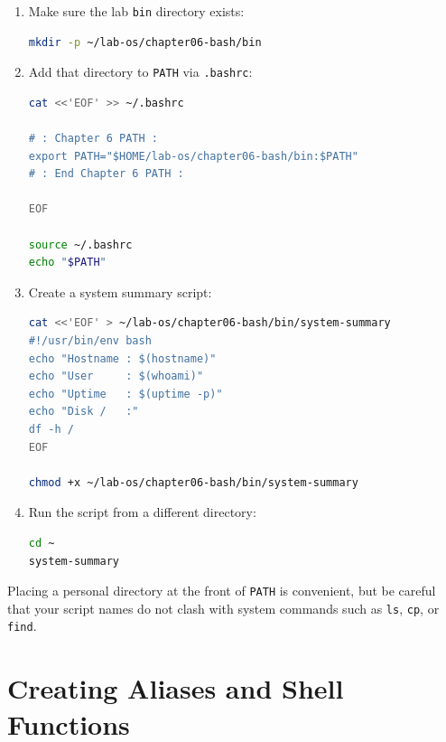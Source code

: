 \begin{enumerate}
  \item Make sure the lab \texttt{bin} directory exists:
\begin{lstlisting}[language=bash, caption={Preparing the bin directory}]
mkdir -p ~/lab-os/chapter06-bash/bin
\end{lstlisting}

  \item Add that directory to \texttt{PATH} via \texttt{.bashrc}:
\begin{lstlisting}[language=bash, caption={Adding the bin directory to PATH}]
cat <<'EOF' >> ~/.bashrc

# : Chapter 6 PATH :
export PATH="$HOME/lab-os/chapter06-bash/bin:$PATH"
# : End Chapter 6 PATH :

EOF

source ~/.bashrc
echo "$PATH"
\end{lstlisting}

  \item Create a system summary script:
\begin{lstlisting}[language=bash, caption={Creating a system-summary script}]
cat <<'EOF' > ~/lab-os/chapter06-bash/bin/system-summary
#!/usr/bin/env bash
echo "Hostname : $(hostname)"
echo "User     : $(whoami)"
echo "Uptime   : $(uptime -p)"
echo "Disk /   :"
df -h /
EOF

chmod +x ~/lab-os/chapter06-bash/bin/system-summary
\end{lstlisting}

  \item Run the script from a different directory:
\begin{lstlisting}[language=bash, caption={Running the script from any location}]
cd ~
system-summary
\end{lstlisting}
\end{enumerate}

\begin{notebox}
Placing a personal directory at the front of \texttt{PATH} is convenient, but
be careful that your script names do not clash with system commands such as
\texttt{ls}, \texttt{cp}, or \texttt{find}.
\end{notebox}

\section{Creating Aliases and Shell Functions}
\label{sec:aliases-functions}

